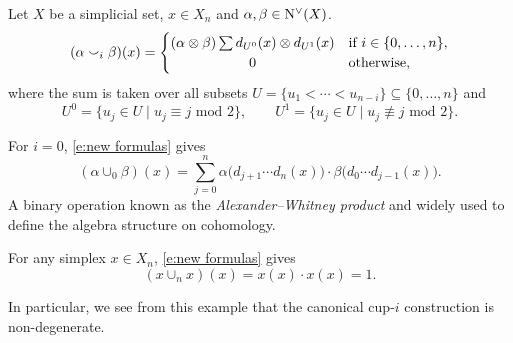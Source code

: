 \begin{definition} \label{d:cup-i coproducts}
	Let $X$ be a simplicial set, $x \in X_n$ and $\alpha, \beta \in \operatorname{N^{\vee}}(X)$.
	\begin{equation} \label{e:new formulas}
	(\alpha \cup_i \beta)(x) =
	\begin{cases}
	(\alpha \ot \beta) \sum d_{U^0}(x) \ot d_{U^1}(x) &
	\text{if } i \in \{0, \dots, n\}, \\
	\hfil 0 &
	\text{otherwise},
	\end{cases}
	\end{equation}
	where the sum is taken over all subsets $U = \{u_1 < \cdots < u_{n-i}\} \subseteq \{0, \dots, n\}$ and
	\begin{equation} \label{e:partition subsets}
	U^0 = \{u_j \in U \mid u_j \equiv j \text{ mod } 2\}, \qquad
	U^1 = \{u_j \in U \mid u_j \not\equiv j \text{ mod } 2\}.
	\end{equation}
\end{definition}

\begin{example} \label{ex:alexander-whitney diagonal}
	For $i = 0$, \cref{e:new formulas} gives
	\begin{equation*}
	(\alpha \cup_0 \beta)(x) =
	\sum_{j=0}^n \alpha \big(d_{j+1} \cdots d_{n}(x)\big) \cdot \beta \big(d_{0} \cdots d_{j-1}(x)\big).
	\end{equation*}
	A binary operation known as the \textit{Alexander--Whitney product} and widely used to define the algebra structure on cohomology.
\end{example}

\begin{example} \label{ex:Sq0 is the identity}
	For any simplex $x \in X_n$, \cref{e:new formulas} gives
	\begin{equation*}
	(x \cup_n x)(x) = x(x) \cdot x(x) = 1.
	\end{equation*}
\end{example}

In particular, we see from this example that the canonical cup-$i$ construction is non-degenerate.

